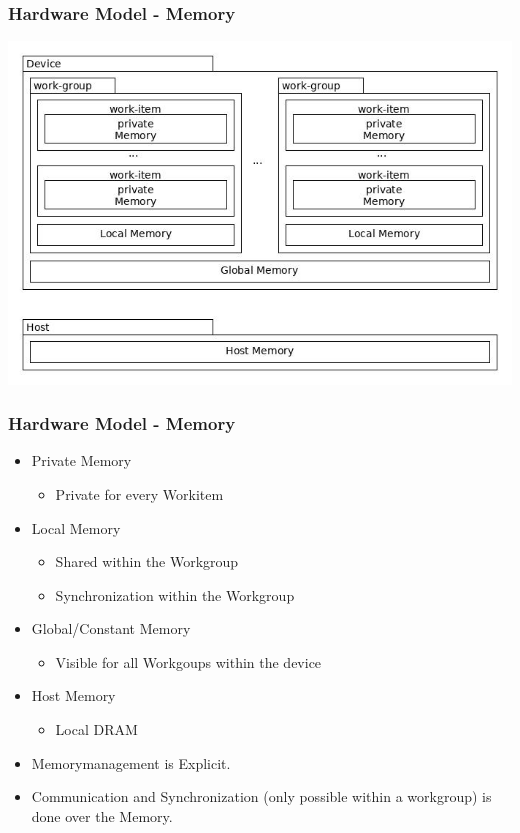 \documentclass{beamer}
\begin{document}
\begin{frame}
    \frametitle{Hardware Model - Memory}
        \includegraphics[width=.8\textwidth]{res/OpenCLMemoryStructure.jpg}
        
\end{frame}
\begin{frame}
    \frametitle{Hardware Model - Memory}
        \begin{itemize}
            \item Private Memory
            \begin{itemize}
             \item Private for every Workitem
            \end{itemize}
            \item Local Memory
            \begin{itemize}
             \item Shared within the Workgroup
             \item Synchronization within the Workgroup
            \end{itemize}
            \item Global/Constant Memory
            \begin{itemize}
             \item Visible for all Workgoups within the device
            \end{itemize}
            \item Host Memory
            \begin{itemize}
             \item Local DRAM
            \end{itemize}
            \item Memorymanagement is Explicit.
            \item Communication and Synchronization (only possible within a workgroup) is done over the Memory.
        \end{itemize}
\end{frame}
\end{document}
